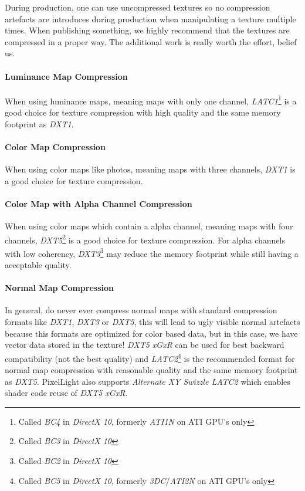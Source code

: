During production, one can use uncompressed textures so no compression artefacts are introduces during production when manipulating a texture multiple times. When publishing something, we highly recommend that the textures are compressed in a proper way. The additional work is really worth the effort, belief us.


\paragraph{Luminance Map Compression}
When using luminance maps, meaning maps with only one channel, \emph{LATC1}\footnote{Called \emph{BC4} in \emph{DirectX 10}, formerly \emph{ATI1N} on ATI GPU's only} is a good choice for texture compression with high quality and the same memory footprint as \emph{DXT1}.


\paragraph{Color Map Compression}
When using color maps like photos, meaning maps with three channels, \emph{DXT1} is a good choice for texture compression.


\paragraph{Color Map with Alpha Channel Compression}
When using color maps which contain a alpha channel, meaning maps with four channels, \emph{DXT5}\footnote{Called \emph{BC3} in \emph{DirectX 10}} is a good choice for texture compression. For alpha channels with low coherency, \emph{DXT3}\footnote{Called \emph{BC2} in \emph{DirectX 10}} may reduce the memory footprint while still having a acceptable quality.


\paragraph{Normal Map Compression}
In general, do never ever compress normal maps with standard compression formats like \emph{DXT1}, \emph{DXT3} or \emph{DXT5}, this will lead to ugly visible normal artefacts because this formats are optimized for color based data, but in this case, we have vector data stored in the texture! \emph{DXT5 xGxR} can be used for best backward compatibility (not the best quality) and \emph{LATC2}\footnote{Called \emph{BC5} in \emph{DirectX 10}, formerly \emph{3DC}/\emph{ATI2N} on ATI GPU's only} is the recommended format for normal map compression with reasonable quality and the same memory footprint as \emph{DXT5}. PixelLight also supports \emph{Alternate XY Swizzle LATC2} which enables shader code reuse of \emph{DXT5 xGxR}.

